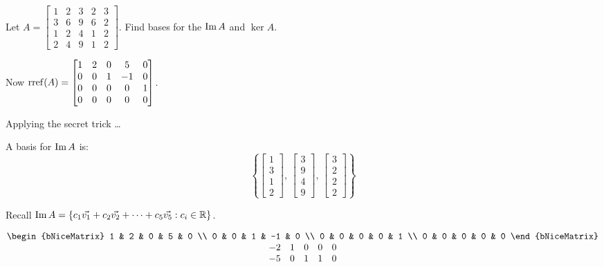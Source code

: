 \documentclass[../main.tex]{subfiles}
\begin{document}
\begin{example}[]
    Let \( A = \begin{bmatrix}
        1 & 2 & 3 & 2 & 3 \\
        3 & 6 & 9 & 6 & 2 \\
        1 & 2 & 4 & 1 & 2 \\
        2 & 4 & 9 & 1 & 2
    \end{bmatrix} \). Find bases for the \( \operatorname{Im} A \) and \( \ker A \).

    Now \( \operatorname{rref}(A) = \begin{bmatrix}
        1 & 2 & 0 & 5 & 0 \\
        0 & 0 & 1 & -1 & 0 \\
        0 & 0 & 0 & 0 & 1 \\
        0 & 0 & 0 & 0 & 0 
    \end{bmatrix} \).
    
    Applying the secret trick \dots

    A basis for \( \operatorname{Im} A \) is:
    \[ \left\{
        \begin{bmatrix} 1 \\ 3 \\ 1 \\ 2 \end{bmatrix}, \,
        \begin{bmatrix} 3 \\ 9 \\ 4 \\ 9 \end{bmatrix}, \,
        \begin{bmatrix} 3 \\ 2 \\ 2 \\ 2 \end{bmatrix}
    \right\} \]
    
    Recall \( \operatorname{Im} A = \left\{ c_1 \vec{v_1}+ c_2 \vec{v_2} + \dots + c_5 \vec{v_5} : c_i \in \mathbb{R} \right\} \).

    \[ \begin{matrix}
        \begin{bNiceMatrix}
            1 & 2 & 0 & 5 & 0 \\
            0 & 0 & 1 & -1 & 0 \\
            0 & 0 & 0 & 0 & 1 \\
            0 & 0 & 0 & 0 & 0
        \end{bNiceMatrix} \\
        \begin{matrix}
            -2 & 1 & 0 & 0 & 0 \\
            -5 & 0 & 1 & 1 & 0
        \end{matrix}
    \end{matrix}
    \]


\end{example}
\end{document}

